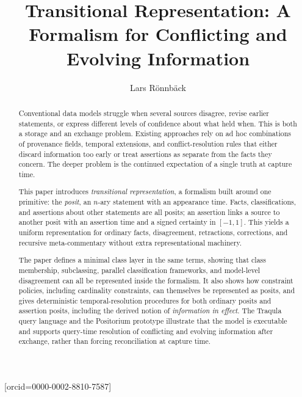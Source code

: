 \documentclass[a4paper,fleqn]{cas-sc}
\begin{document}
\let\WriteBookmarks\relax
\def\floatpagepagefraction{1}
\def\textpagefraction{.001}


\title[mode=title]{Transitional Representation: A Formalism for Conflicting and Evolving Information}

\author[1]{Lars R\"onnb\"ack}[orcid=0000-0002-8810-7587]
\cormark[1]

\begin{abstract}
Conventional data models struggle when several sources disagree, revise earlier statements, or express different levels of confidence about what held when. This is both a storage and an exchange problem. Existing approaches rely on ad hoc combinations of provenance fields, temporal extensions, and conflict-resolution rules that either discard information too early or treat assertions as separate from the facts they concern. The deeper problem is the continued expectation of a single truth at capture time.

This paper introduces \emph{transitional representation}, a formalism built around one primitive: the \emph{posit}, an \(n\)-ary statement with an appearance time. Facts, classifications, and assertions about other statements are all posits; an assertion links a source to another posit with an assertion time and a signed certainty in \([-1,1]\). This yields a uniform representation for ordinary facts, disagreement, retractions, corrections, and recursive meta-commentary without extra representational machinery.

The paper defines a minimal class layer in the same terms, showing that class membership, subclassing, parallel classification frameworks, and model-level disagreement can all be represented inside the formalism. It also shows how constraint policies, including cardinality constraints, can themselves be represented as posits, and gives deterministic temporal-resolution procedures for both ordinary posits and assertion posits, including the derived notion of \emph{information in effect}. The Traqula query language and the Positorium prototype illustrate that the model is executable and supports query-time resolution of conflicting and evolving information after exchange, rather than forcing reconciliation at capture time.
\end{abstract}
\end{document}

